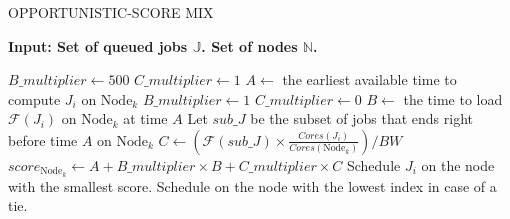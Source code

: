\documentclass[a4paper]{article}
\newcommand{\Node}[1]{\ensuremath{\mathrm{Node}_{#1}}\xspace}
\newcommand{\inputs}{\ensuremath{\mathcal{F}}\xspace}
\newcommand{\memory}{\ensuremath{\mathcal{M}}\xspace}
\newcommand{\bandwidth}{\mathit{BW}\xspace}
\newcommand{\core}{\mathit{Cores}\xspace}
\newcommand{\jobset}{\ensuremath{\mathbb{J}}\xspace}
\newcommand{\nodeset}{\ensuremath{\mathbb{N}}\xspace}
\begin{document}
\begin{algorithm}[htbp]
\caption{OPPORTUNISTIC-SCORE MIX}
\hspace*{\algorithmicindent} \textbf{Input: Set of queued jobs $\jobset$. Set of nodes $\nodeset$.} \\
\begin{algorithmic}[1]
\ForEach {$J_i \in \jobset$}
	\State $B\_multiplier \gets 500$
	\State $C\_multiplier \gets 1$
	\ForEach {$\Node{k} \in \nodeset$}
		\State $A \gets$ the earliest available time to compute $J_i$ on $\Node{k}$
			\State $B\_multiplier \gets 1$
			\State $C\_multiplier \gets 0$
		\EndIf
		\State $B \gets$ the time to load $\inputs(J_i)$ on $\Node{k}$ at time $A$
		\State Let $\mathit{sub\_J}$ be the subset of jobs that ends right before time $A$ on $\Node{k}$
		\State $C \gets (\inputs(\mathit{sub\_J}) \times \frac{\core(J_i)}{\core(\Node{k})})/\bandwidth$
		\State $score_{\Node{k}} \gets A + B\_multiplier \times B + C\_multiplier \times C$
	\EndFor
	\State Schedule $J_i$ on the node with the smallest score. Schedule on the node with the lowest index in case of a tie.
\EndFor
\end{algorithmic}
\end{algorithm}
\end{document}
